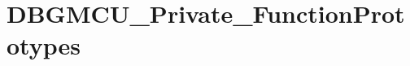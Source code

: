 \hypertarget{group___d_b_g_m_c_u___private___function_prototypes}{}\section{D\+B\+G\+M\+C\+U\+\_\+\+Private\+\_\+\+Function\+Prototypes}
\label{group___d_b_g_m_c_u___private___function_prototypes}
